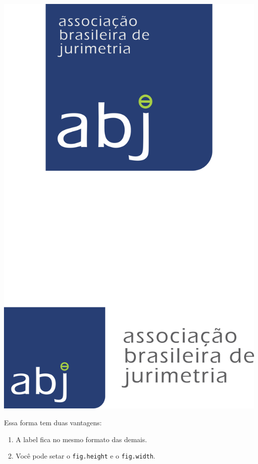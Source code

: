 \documentclass[]{report}
\providecommand{\tightlist}{%
  \setlength{\itemsep}{0pt}\setlength{\parskip}{0pt}}
\let\origfigure\figure
\let\endorigfigure\endfigure
\renewenvironment{figure}[1][2] {
    \expandafter\origfigure\expandafter[H]
} {
    \endorigfigure
}
\theoremstyle{definition}
\theoremstyle{definition}
\theoremstyle{definition}
\theoremstyle{remark}
\begin{document}
\begin{figure}

{\centering \includegraphics{imgs/logo_abj} 

}

\caption{The RStudio addin to help input LaTeX math.}\label{fig:mathquill}
\end{figure}

Essa forma tem duas vantagens:

\begin{enumerate}
\def\labelenumi{\arabic{enumi}.}
\tightlist
\item
  A label fica no mesmo formato das demais.
\item
  Você pode setar o \texttt{fig.height} e o \texttt{fig.width}.
\end{enumerate}
\end{document}
